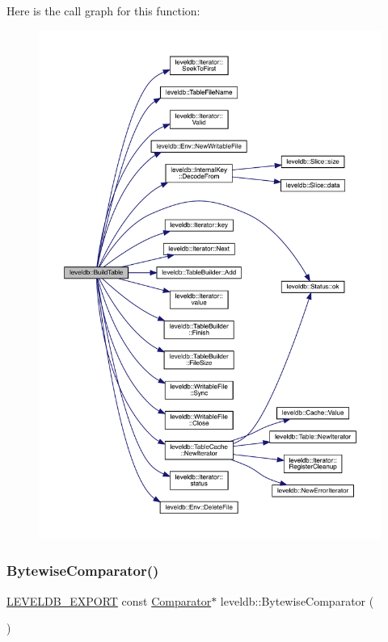 Here is the call graph for this function\+:
\nopagebreak
\begin{figure}[H]
\begin{center}
\leavevmode
\includegraphics[width=350pt]{namespaceleveldb_a10e102da98819e1a1f9b254241482e65_cgraph}
\end{center}
\end{figure}
\mbox{\label{namespaceleveldb_aaefedd89ff6910738cb4c8e629087b93}} 
\subsubsection{\texorpdfstring{BytewiseComparator()}{BytewiseComparator()}}
{\footnotesize\ttfamily \mbox{\hyperlink{export_8h_a658cd25b9dd114d894ae8ce9dddb7d3a}{L\+E\+V\+E\+L\+D\+B\+\_\+\+E\+X\+P\+O\+RT}} const \mbox{\hyperlink{structleveldb_1_1_comparator}{Comparator}}$\ast$ leveldb\+::\+Bytewise\+Comparator (\begin{DoxyParamCaption}{ }\end{DoxyParamCaption})}

